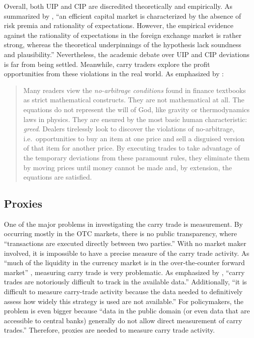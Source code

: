\documentclass[a4paper, twoside]{templates/ociamthesis}
\begin{document}
Overall, both UIP and CIP are discredited theoretically and empirically. As summarized by \textcite[ 276]{moosa2015}, ``an efficient capital market is characterized by the absence of risk premia and rationality of expectations. However, the empirical evidence against the rationality of expectations in the foreign exchange market is rather strong, whereas the theoretical underpinnings of the hypothesis lack soundness and plausibility.'' Nevertheless, the academic debate over UIP and CIP deviations is far from being settled. Meanwhile, carry traders explore the profit opportunities from these violations in the real world. As emphasized by \textcite[ 11]{dubil2011}:

\begin{quote}
Many readers view the \emph{no-arbitrage conditions} found in finance textbooks as strict mathematical constructs. They are not mathematical at all. The equations do not represent the will of God, like gravity or thermodynamics laws in physics. They are ensured by the most basic human characteristic: \emph{greed}. Dealers tirelessly look to discover the violations of no-arbitrage, i.e.~opportunities to buy an item at one price and sell a disguised version of that item for another price. By executing trades to take advantage of the temporary deviations from these paramount rules, they eliminate them by moving prices until money cannot be made and, by extension, the equations are satisfied.
\end{quote}

\hypertarget{twothreefour}{%
\subsection{Proxies}\label{twothreefour}}

\noindent One of the major problems in investigating the carry trade is measurement. By occurring mostly in the OTC markets, there is no public transparency, where ``transactions are executed directly between two parties.'' \autocite[ 7]{kritzer2012} With no market maker involved, it is impossible to have a precise measure of the carry trade activity. As ``much of the liquidity in the currency market is in the over‐the‐counter forward market'' \autocite[ 321]{brunnermeier2008}, measuring carry trade is very problematic. As emphasized by \textcite[ 27]{galati2007}, ``carry trades are notoriously difficult to track in the available data.'' Additionally, ``it is difficult to measure carry-trade activity because the data needed to definitively assess how widely this strategy is used are not available.'' \autocite[ 441]{curcuru2011} For policymakers, the problem is even bigger because ``data in the public domain (or even data that are accessible to central banks) generally do not allow direct measurement of carry trades.'' \autocite[ 81]{bankforinternationalsettlements2015} Therefore, proxies are needed to measure carry trade activity.
\end{document}
